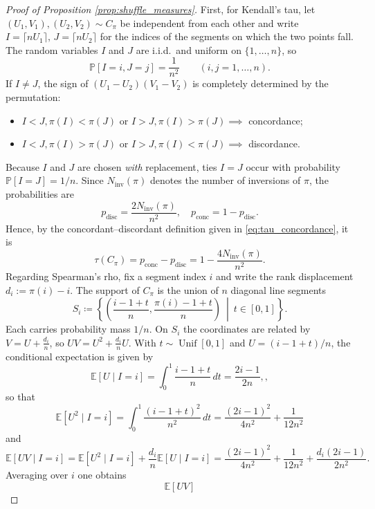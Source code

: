 \documentclass{article}
\theoremstyle{definition}
\begin{document}
\begin{proof}[Proof of Proposition \ref{prop:shuffle_measures}]\label{proof:shuffle_measures}
    First, for Kendall’s tau, let $(U_1,V_1),(U_2,V_2)\sim C_{\pi}$ be independent from each other and write $I=\lceil nU_1\rceil,\,J=\lceil nU_2\rceil$ for the indices of the segments on which the two points fall.
    The random variables $I$ and $J$ are i.i.d.\ and uniform on
    $\{1,\dots ,n\}$, so
    \[
        \mathbb{P}[I=i,J=j]=\frac1{n^2}\qquad(i,j=1,\dots ,n).
    \]
    If $I\neq J$, the sign of $(U_1-U_2)(V_1-V_2)$ is completely determined by the permutation:
    \begin{itemize}
        \item $I<J,\pi(I)<\pi(J)$ or $I>J,\pi(I)>\pi(J)\implies$ concordance;
        \item $I<J,\pi(I)>\pi(J)$ or $I>J,\pi(I)<\pi(J)\implies$ discordance.
    \end{itemize}
    Because $I$ and $J$ are chosen \emph{with} replacement, ties $I=J$ occur with probability $\mathbb{P}[I=J]=1/n$.
    Since $N_{\mathrm{inv}}(\pi)$ denotes the number of inversions of $\pi$, the probabilities are
    \[
        p_{\text{disc}}=\frac{\displaystyle 2N_{\mathrm{inv}}(\pi)}{n^2},
        \quad p_{\text{conc}} =1-p_{\text{disc}}.
    \]
    Hence, by the concordant–discordant definition given in \eqref{eq:tau_concordance}, it is
    \[
        \tau(C_\pi)=p_{\text{conc}}-p_{\text{disc}}
        = 1-\frac{4N_{\mathrm{inv}}(\pi)}{n^2}.
    \]     
    Regarding Spearman’s rho, fix a segment index $i$ and write the rank displacement
    $d_i:=\pi(i)-i$.
    The support of $C_\pi$ is the union of $n$ diagonal line segments
    \[
        S_i\coloneq\left\{\left(\frac{i-1+t}{n},\frac{\pi(i)-1+t}{n}\right)~\middle|~ t\in[0,1]\right\}
    .\]
    Each carries probability mass $1/n$. On $S_i$ the coordinates are related by $V=U+\frac{d_i}{n}$, so $UV=U^2+\frac{d_i}{n}U$.
    With $t\sim\operatorname{Unif}[0,1]$ and $U=(i-1+t)/n$, the conditional expectation is given by
    \[
    \mathbb{E}[U\mid I=i]
    =\int_{0}^{1}\frac{i-1+t}{n}\,dt
    =\frac{2i-1}{2n},
    ,\]
    so that
    \[
    \mathbb{E}[U^{2}\mid I=i]
    =\int_{0}^{1}\frac{(i-1+t)^{2}}{n^{2}}\,dt
    =\frac{(2i-1)^{2}}{4n^{2}}+\frac{1}{12n^{2}}
    \]
    and
    \[
        \mathbb{E}\left[UV\mid I=i\right]
            =\mathbb{E}[U^{2}\mid I=i]+\frac{d_i}{n}\mathbb{E}[U\mid I=i]
            =\frac{(2i-1)^{2}}{4n^{2}}+\frac{1}{12n^{2}}
            +\frac{d_i(2i-1)}{2n^{2}}.
    \]
    Averaging over $i$ one obtains
    \[
        \mathbb{E}[UV]
\]
\end{proof}
\end{document}
